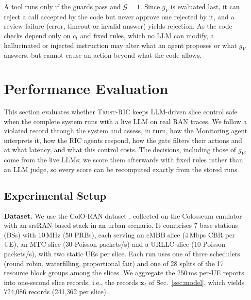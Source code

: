 \documentclass[conference]{IEEEtran}
\newcommand{\fw}{\textsc{Trust-RIC}}
\newcommand{\G}{\mathcal{G}}
\begin{document}
\noindent A tool runs only if the guards pass and $\G=1$. Since $g_V$ is evaluated last, it can reject a call accepted by the code but never approve one rejected by it, and a review failure (error, timeout or invalid answer) yields rejection. As the code checks depend only on $c_t$ and fixed rules, which no LLM can modify, a hallucinated or injected instruction may alter what an agent proposes or what $g_V$ answers, but cannot cause an action beyond what the code allows.













\section{Performance Evaluation}\label{sec:eval}
This section evaluates whether \fw{} keeps LLM-driven slice control safe when the complete system runs with a live LLM on real RAN traces. We follow a violated record through the system and assess, in turn, how the Monitoring agent interprets it, how the RIC agents respond, how the gate filters their actions and at what latency, and what this control costs. 
The decisions, including those of $g_V$, come from the live LLMs; we score them afterwards with fixed rules rather than an LLM judge, so every score can be recomputed exactly from the stored runs.

\subsection{Experimental Setup}\label{sec:setup}
\noindent\textbf{Dataset.} We use the ColO-RAN dataset \cite{polese2023coloran},
collected on the Colosseum emulator with an srsRAN-based stack in an urban
scenario. It comprises 7 base stations (BSs) with 10\,MHz (50 PRBs), each
serving an eMBB slice (4\,Mbps CBR per UE), an MTC slice (30 Poisson packets/s)
and a URLLC slice (10 Poisson packets/s), with two static UEs per slice. Each
run uses one of three schedulers (round robin, waterfilling, proportional fair)
and one of 28 splits of the 17 resource block groups among the slices. We
aggregate the 250\,ms per-UE reports into one-second slice records, i.e., the
records $\mathbf{x}_t$ of Sec.~\ref{sec:model}, which yields 724{,}086 records
(241{,}362 per slice).
\end{document}
